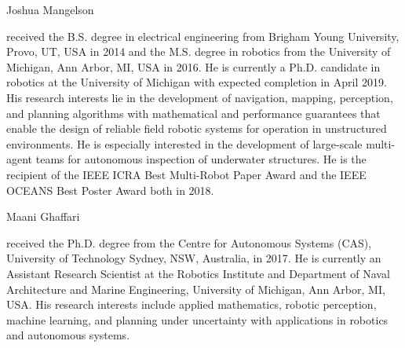 \documentclass[journal]{style/IEEEtran}
\theoremstyle{nospace}
\begin{document}
\begin{IEEEbiography}{Joshua Mangelson}

received the B.S. degree in electrical engineering from Brigham Young University, Provo, UT, USA in 2014 and the M.S. degree in robotics from the University of Michigan, Ann Arbor, MI, USA in 2016. He is currently a Ph.D. candidate in robotics at the University of Michigan with expected completion in April 2019. His research interests lie in the development of navigation, mapping, perception, and planning algorithms with mathematical and performance guarantees that enable the design of reliable field robotic systems for operation in unstructured environments. He is especially interested in the development of large-scale multi-agent teams for autonomous inspection of underwater structures. He is the recipient of the IEEE ICRA Best Multi-Robot Paper Award and the IEEE OCEANS Best Poster Award both in 2018. 
\end{IEEEbiography}

\vspace{-2 cm}

\begin{IEEEbiography}{Maani Ghaffari}

received the Ph.D. degree from the Centre for Autonomous Systems (CAS), University of Technology Sydney, NSW, Australia, in 2017. He is currently an Assistant Research Scientist at the Robotics Institute and Department of Naval Architecture and Marine Engineering, University of Michigan, Ann Arbor, MI, USA. His research interests include applied mathematics, robotic perception, machine learning, and planning under uncertainty with applications in robotics and autonomous systems.
\end{IEEEbiography}
\end{document}
